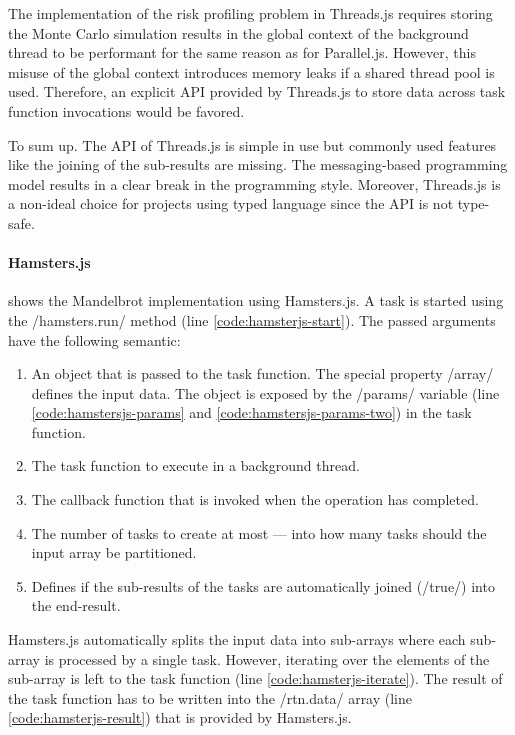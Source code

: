 The implementation of the risk profiling problem in Threads.js requires storing the Monte Carlo simulation results in the global context of the background thread to be performant for the same reason as for Parallel.js. However, this misuse of the global context introduces memory leaks if a shared thread pool is used. Therefore, an explicit API provided by Threads.js to store data across task function invocations would be favored.

To sum up. The API of Threads.js is simple in use but commonly used features like the joining of the sub-results are missing. The messaging-based programming model results in a clear break in the programming style. Moreover, Threads.js is a non-ideal choice for projects using typed language since the API is not type-safe.

\paragraph{Hamsters.js}
 shows the Mandelbrot implementation using Hamsters.js. A task is started using the \javascriptinline/hamsters.run/ method (line \ref{code:hamsterjs-start}). The passed arguments have the following semantic:

\begin{enumerate}
	\item An object that is passed to the task function. The special property \javascriptinline/array/ defines the input data. The object is exposed by the \javascriptinline/params/ variable (line \ref{code:hamstersjs-params} and \ref{code:hamstersjs-params-two}) in the task function.
	\item The task function to execute in a background thread.
	\item The callback function that is invoked when the operation has completed.
	\item The number of tasks to create at most --- into how many tasks should the input array be partitioned. 
	\item Defines if the sub-results of the tasks are automatically joined (\javascriptinline/true/) into the end-result.
\end{enumerate}

Hamsters.js automatically splits the input data into sub-arrays where each sub-array is processed by a single task. However, iterating over the elements of the sub-array is left to the task function (line \ref{code:hamsterjs-iterate}). The result of the task function has to be written into the \javascriptinline/rtn.data/ array (line \ref{code:hamsterjs-result}) that is provided by Hamsters.js. 

